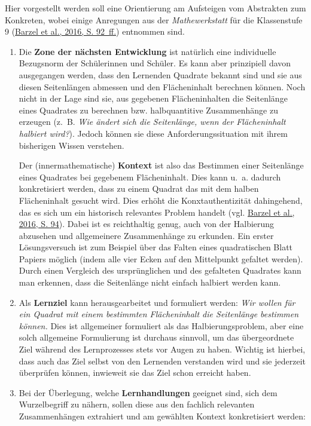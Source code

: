 \documentclass[
  ngerman,
]{scrbook}
\theoremstyle{definition}
\theoremstyle{definition}
\theoremstyle{definition}
\theoremstyle{definition}
\theoremstyle{remark}
\begin{document}
Hier vorgestellt werden soll eine Orientierung am Aufsteigen vom Abstrakten zum Konkreten, wobei einige Anregungen aus der \emph{Mathewerkstatt} für die Klassenstufe 9 (\protect\hyperlink{ref-Barzel2016}{Barzel et al., 2016, S. 92~ff.}) entnommen sind.

\begin{enumerate}
\def\labelenumi{\arabic{enumi}.}
\item
  Die \textbf{Zone der nächsten Entwicklung} ist natürlich eine individuelle Bezugsnorm der Schülerinnen und Schüler. Es kann aber prinzipiell davon ausgegangen werden, dass den Lernenden Quadrate bekannt sind und sie aus diesen Seitenlängen abmessen und den Flächeninhalt berechnen können. Noch nicht in der Lage sind sie, aus gegebenen Flächeninhalten die Seitenlänge eines Quadrates zu berechnen bzw. halbquantitive Zusammenhänge zu erzeugen (z.~B. \emph{Wie ändert sich die Seitenlänge, wenn der Flächeninhalt halbiert wird?}). Jedoch können sie diese Anforderungssituation mit ihrem bisherigen Wissen verstehen.

  Der (innermathematische) \textbf{Kontext} ist also das Bestimmen einer Seitenlänge eines Quadrates bei gegebenem Flächeninhalt. Dies kann u.~a. dadurch konkretisiert werden, dass zu einem Quadrat das mit dem halben Flächeninhalt gesucht wird. Dies erhöht die Konxtauthentizität dahingehend, das es sich um ein historisch relevantes Problem handelt (vgl. \protect\hyperlink{ref-Barzel2016}{Barzel et al., 2016, S. 94}). Dabei ist es reichthaltig genug, auch von der Halbierung abzusehen und allgemeinere Zusammenhänge zu erkunden. Ein erster Lösungsversuch ist zum Beispiel über das Falten eines quadratischen Blatt Papiers möglich (indem alle vier Ecken auf den Mittelpunkt gefaltet werden). Durch einen Vergleich des ursprünglichen und des gefalteten Quadrates kann man erkennen, dass die Seitenlänge nicht einfach halbiert werden kann.
\item
  Als \textbf{Lernziel} kann herausgearbeitet und formuliert werden: \emph{Wir wollen für ein Quadrat mit einem bestimmten Flächeninhalt die Seitenlänge bestimmen können.} Dies ist allgemeiner formuliert als das Halbierungsproblem, aber eine solch allgemeine Formulierung ist durchaus sinnvoll, um das übergeordnete Ziel während des Lernprozesses stets vor Augen zu haben. Wichtig ist hierbei, dass auch das Ziel selbst von den Lernenden verstanden wird und sie jederzeit überprüfen können, inwieweit sie das Ziel schon erreicht haben.
\item
  Bei der Überlegung, welche \textbf{Lernhandlungen} geeignet sind, sich dem Wurzelbegriff zu nähern, sollen diese aus den fachlich relevanten Zusammenhängen extrahiert und am gewählten Kontext konkretisiert werden:


\end{enumerate}
\end{document}
